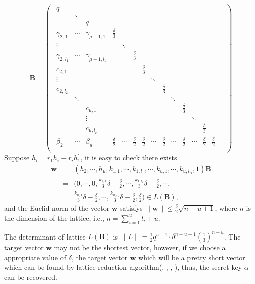 \documentclass[sigconf]{acmart}
\begin{document}
  \begin{equation}
    \label{SigEqu3}
     \textbf{B}=\left(\begin{matrix}

\begin{smallmatrix}
 q&&&&&&&&&&\\
&\ddots&&&&&&&&&\\
&&q&&&&&&& &\\
\gamma_{2,1}&\cdots&\gamma_{\mu-1,1}&\frac{\delta}{3}&&&&&&\\
\vdots&&&&\ddots&&&&&\\
\gamma_{2,l_1}&\cdots&\gamma_{\mu-1,l_1}&&&\frac{\delta}{3}&&&&&\\
c_{2,1}&&&&&&\frac{\delta}{3}&&&&&&\\
\vdots&&&&&&&\ddots&&\\
c_{2,l_2}&&&&&&&&\frac{\delta}{3}&&&&&\\
&\ddots&&&&&&&&\ddots&&&&\\
&&c_{\mu,1}&&&&&&&&\frac{\delta}{3}&&&\\
&&\vdots&&&&&&&&&\ddots&&\\
&&c_{\mu,l_\mu}&&&&&&&&&&\frac{\delta}{3}&\\
\beta_2&\cdots&\beta_u&\frac{\delta}{2}&\cdots&\frac{\delta}{2}&\frac{\delta}{2}&\cdots& \frac{\delta}{2}&\cdots&\frac{\delta}{2}&\cdots&\frac{\delta}{2}&\frac{\delta}{2}\\

\end{smallmatrix}&

\end{matrix}\right)
  \end{equation}
  Suppose $h_i=r_1h_i^{'}-r_ih_1^{'}$, it is easy to check there exists
  $$
  \begin{array}{lll}
  \textbf{w}&=&(h_2,\cdots,h_{\mu},k_{1,1},\cdots,k_{1,l_1},\cdots,k_{u,1},\cdots,k_{u,l_u},1)\textbf{B}\\
  &=&(0,\cdots,0,\frac{k_{1,1}}{3}\delta-\frac{\delta}{2},\cdots,\frac{k_{1,l_1}}{3}\delta-\frac{\delta}{2},\cdots, \\
  &&\frac{k_{u,1}}{3}\delta-\frac{\delta}{2},\cdots,\frac{k_{u,l_u}}{3}\delta-\frac{\delta}{2},\frac{\delta}{2})\in L(\textbf{B}),
  \end{array}
  $$
and the Euclid norm of the vector $\textbf{w}$ satisfys
$\|\textbf{w}\|\leq \frac{\delta}{2}\sqrt{n-u+1}$, where $n$ is the dimension of the lattice, i.e., $n=\sum\limits_{i=1}^{u}l_i+u$.

The determinant of lattice $L(\textbf{B})$ is $\|L\|=\frac{1}{2}q^{u-1}\cdot {\delta}^{n-u+1}(\frac{1}{3})^{n-u}$. The target vector $\textbf{w}$ may not be the shortest vector, however, if we choose a appropriate value of $\delta$, the target vector $\textbf{w}$ which will be a pretty short vector which can be found by lattice reduction algorithm(\cite{LLL82}, \cite{SE94}, \cite{CN12}, \cite{ADH+19}), thus, the secret key $\alpha$ can be recovered.
\end{document}
